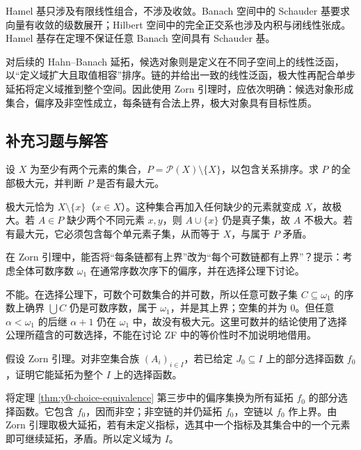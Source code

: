 \begin{remark}[代数基与拓扑基]
Hamel 基只涉及有限线性组合，不涉及收敛。Banach 空间中的 Schauder 基要求向量有收敛的级数展开；Hilbert 空间中的完全正交系也涉及内积与闭线性张成。Hamel 基存在定理不保证任意 Banach 空间具有 Schauder 基。
\end{remark}

对后续的 Hahn--Banach 延拓，候选对象则是定义在不同子空间上的线性泛函，以“定义域扩大且取值相容”排序。链的并给出一致的线性泛函，极大性再配合单步延拓将定义域推到整个空间。因此使用 Zorn 引理时，应依次明确：候选对象形成集合，偏序及非空性成立，每条链有合法上界，极大对象具有目标性质。

\subsection{补充习题与解答}
\begin{exercise}[极大元可以不唯一]
设 $X$ 为至少有两个元素的集合，$P=\mathcal P(X)\setminus\{X\}$，以包含关系排序。求 $P$ 的全部极大元，并判断 $P$ 是否有最大元。
\end{exercise}
\begin{solution}
极大元恰为 $X\setminus\{x\}$（$x\in X$）。这种集合再加入任何缺少的元素就变成 $X$，故极大。若 $A\in P$ 缺少两个不同元素 $x,y$，则 $A\cup\{x\}$ 仍是真子集，故 $A$ 不极大。若有最大元，它必须包含每个单元素子集，从而等于 $X$，与属于 $P$ 矛盾。
\end{solution}

\begin{exercise}[有界的数列并不足够]
在 Zorn 引理中，能否将“每条链都有上界”改为“每个可数链都有上界”？提示：考虑全体可数序数 $\omega_1$ 在通常序数次序下的偏序，并在选择公理下讨论。
\end{exercise}
\begin{solution}
不能。在选择公理下，可数个可数集合的并可数，所以任意可数子集 $C\subseteq\omega_1$ 的序数上确界 $\bigcup C$ 仍是可数序数，属于 $\omega_1$，并是其上界；空集的并为 $0$。但任意 $\alpha<\omega_1$ 的后继 $\alpha+1$ 仍在 $\omega_1$ 中，故没有极大元。这里可数并的结论使用了选择公理所蕴含的可数选择，不能在讨论 ZF 中的等价性时不加说明地借用。
\end{solution}

\begin{exercise}[已指定的局部选择可以延拓]
假设 Zorn 引理。对非空集合族 $(A_i)_{i\in I}$，若已给定 $J_0\subseteq I$ 上的部分选择函数 $f_0$，证明它能延拓为整个 $I$ 上的选择函数。
\end{exercise}
\begin{solution}
将定理 \ref{thm:y0-choice-equivalence} 第三步中的偏序集换为所有延拓 $f_0$ 的部分选择函数。它包含 $f_0$，因而非空；非空链的并仍延拓 $f_0$，空链以 $f_0$ 作上界。由 Zorn 引理取极大延拓，若有未定义指标，选其中一个指标及其集合中的一个元素即可继续延拓，矛盾。所以定义域为 $I$。
\end{solution}
